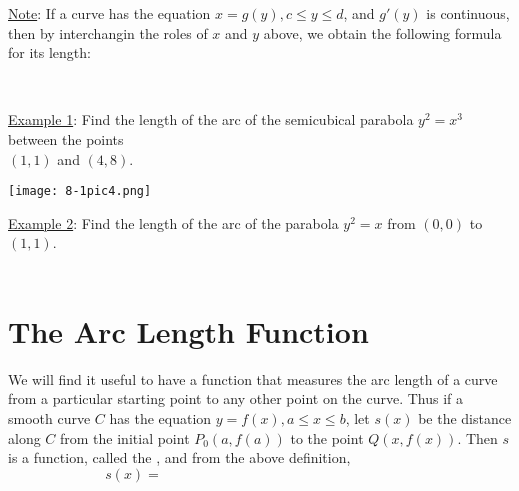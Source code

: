 \documentclass[paper=a4, fontsize=11pt]{scrartcl} %
\numberwithin{equation}{section} %
\numberwithin{figure}{section} %
\numberwithin{table}{section} %
\begin{document}
  \underline{Note}: If a curve has the equation $x=g(y), c\leq y\leq d$, and $g'(y)$ is continuous, then by interchangin the roles of $x$ and $y$ above, we obtain the following formula for its length:\\
  \indent
  
  \fbox{
  \parbox{\textwidth}{
  \vspace{25pt}
  
  \[L = \hspace{4.5in}\]
  
  \vspace{25pt}
  }}
  \indent\\
  \indent

  \underline{Example 1}: Find the length of the arc of the semicubical parabola $y^2=x^3$ between the points\\
  \hspace{0.79in} $(1,1)$ and $(4,8)$.\\
  \indent
  
  \quad \quad \texttt{[image: 8-1pic4.png]}
  
  \vspace{3in}
  
  \underline{Example 2}: Find the length of the arc of the parabola $y^2=x$ from $(0,0)$ to $(1,1)$.\\
  \indent\\
  
  \vspace{4in}
  
  \section*{The Arc Length Function}
  
  We will find it useful to have a function that measures the arc length of a curve from a particular starting point to any other point on the curve. Thus if a smooth curve $C$ has the equation $y=f(x), a\leq x\leq b$, let $s(x)$ be the distance along $C$ from the initial point $P_0(a,f(a))$ to the point $Q(x,f(x))$. Then $s$ is a function, called the \underline{\hspace{0.5in}} \underline{\hspace{1in}} \underline{\hspace{1.25in}}, and from the above definition,\\
  
  \[s(x) = \hspace{3in}\]
  \indent\\
  \indent
  
\end{document}
